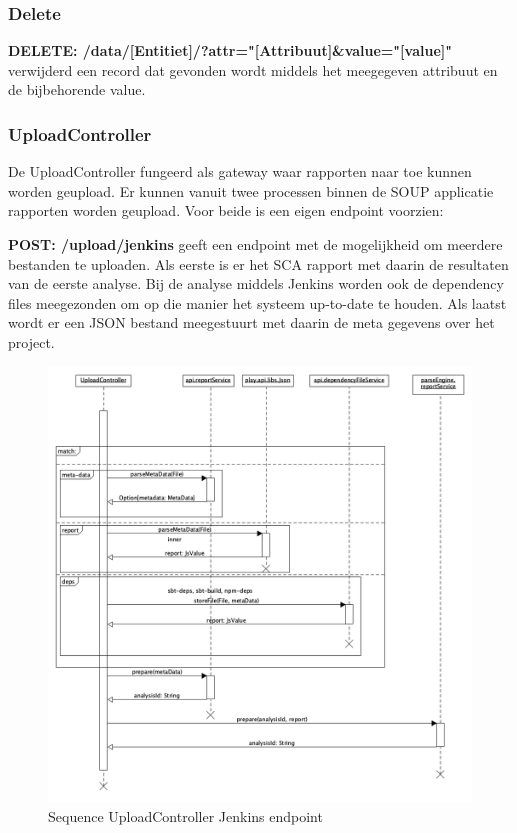 \subsubsection*{Delete}
\textbf{DELETE: /data/[Entitiet]/?attr="[Attribuut]\&value="[value]"} verwijderd een record dat gevonden wordt middels het meegegeven attribuut en de bijbehorende value.


\subsubsection{UploadController}
De UploadController fungeerd als gateway waar rapporten naar toe kunnen worden geupload. Er kunnen vanuit twee processen binnen de SOUP applicatie rapporten worden geupload. Voor beide is een eigen endpoint voorzien:

\textbf{POST: /upload/jenkins} geeft een endpoint met de mogelijkheid om meerdere bestanden te uploaden. Als eerste is er het SCA rapport met daarin de resultaten van de eerste analyse. Bij de analyse middels Jenkins worden ook de dependency files meegezonden om op die manier het systeem up-to-date te houden. Als laatst wordt er een JSON bestand meegestuurt met daarin de meta gegevens over het project.

\begin{figure}[bth]
    \myfloatalign
    \includegraphics[width=12cm]{gfx/umlet/exports/SequploadController-Jenkins}
    \caption{Sequence UploadController Jenkins endpoint}
    \label{fig:SequenceUploadReportJenkins}
\end{figure}

